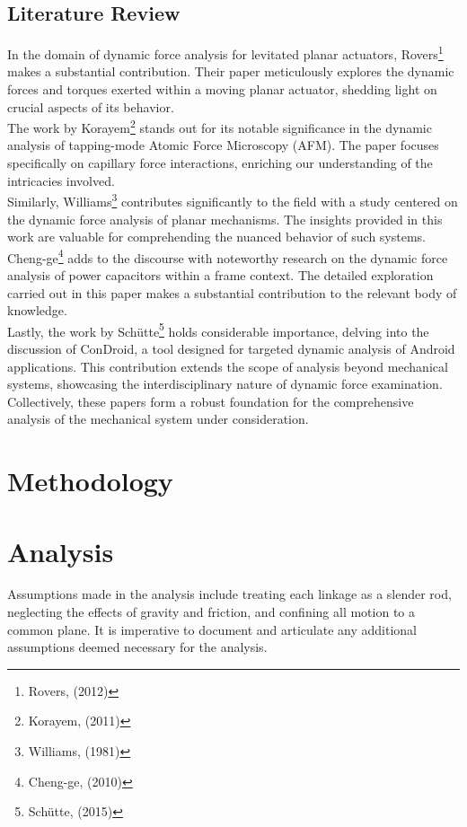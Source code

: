 \documentclass[12pt, titlepage]{article}
\begin{document}
\subsection{Literature Review}
In the domain of dynamic force analysis for levitated planar actuators,
Rovers\footnote{Rovers, (2012)} makes a substantial contribution. Their paper
meticulously explores the dynamic forces and torques exerted within a moving
planar actuator, shedding light on crucial aspects of its behavior.\\[10pt]
The work by Korayem\footnote{Korayem, (2011)} stands out for its notable
significance in the dynamic analysis of tapping-mode Atomic Force Microscopy
(AFM). The paper focuses specifically on capillary force interactions,
enriching our understanding of the intricacies involved.\\[10pt]
Similarly, Williams\footnote{Williams, (1981)} contributes significantly to the
field with a study centered on the dynamic force analysis of planar mechanisms.
The insights provided in this work are valuable for comprehending the nuanced
behavior of such systems.\\[10pt]
Cheng-ge\footnote{Cheng-ge, (2010)} adds to the discourse with noteworthy
research on the dynamic force analysis of power capacitors within a frame
context. The detailed exploration carried out in this paper makes a substantial
contribution to the relevant body of knowledge.\\[10pt]
Lastly, the work by Schütte\footnote{Schütte, (2015)} holds considerable
importance, delving into the discussion of ConDroid, a tool designed for
targeted dynamic analysis of Android applications. This contribution extends
the scope of analysis beyond mechanical systems, showcasing the
interdisciplinary nature of dynamic force examination.\\[10pt]
Collectively, these papers form a robust foundation for the comprehensive analysis of the mechanical system under consideration.
\newpage
\section{Methodology}
\newpage
\section{Analysis}
Assumptions made in the analysis include treating each linkage as a slender
rod, neglecting the effects of gravity and friction, and confining all motion
to a common plane. It is imperative to document and articulate any additional
assumptions deemed necessary for the analysis.
\newpage
\end{document}
